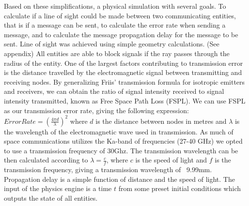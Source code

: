 \documentclass[a4paper,12pt]{article}
\begin{document}
Based on these simplifications, a physical simulation with several goals. To calculate if a line of 
sight could be made between two communicating entities, that is if a message can be sent, to calculate 
the error rate when sending a message, and to calculate the message propagation delay for the message to 
be sent. Line of sight was achieved using simple geometry calculations. (See appendix) All entities are able to block 
signals if the ray passes through the radius of the entity.
One of the largest factors contributing to transmission error is the distance  travelled by the electromagnetic signal between transmitting and receiving nodes. By generalizing Friis' transmission formula for isotropic emitters and receivers, we can obtain the ratio of signal intensity received to signal intensity transmitted, known as Free Space Path Loss (FSPL). We can use FSPL as our transmission error rate, giving the following expression: $Error Rate = (\frac{4 \pi d}{\lambda})^2$ where $d$ is the distance between nodes in metres and $\lambda$ is the wavelength of the electromagnetic wave used in transmission. As much of space communications utilizes the Ka-band of frequencies (27-40 GHz) we opted to use a transmission frequency of 30Ghz. The transmission wavelength can be then calculated according to $\lambda = \frac{c}{f}$, where $c$ is the speed of light and $f$ is the transmission frequency, giving a transmission wavelength of ~9.99mm.
Propagation delay is a simple function of distance and the speed of light. The input of the physics engine 
is a time $t$ from some preset initial conditions which outputs the state of all entities.
\end{document}
